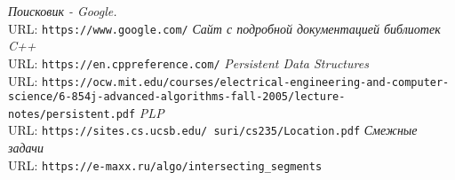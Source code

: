\begin{thebibliography}{99}
{\itshape Поисковик - Google.} \\URL: \texttt{https://www.google.com/}
{\itshape Сайт с подробной документацией библиотек C++} \\URL: \texttt{https://en.cppreference.com/}
{\itshape Persistent Data Structures} \\URL: \texttt{https://ocw.mit.edu/courses/electrical-engineering-and-computer-science/6-854j-advanced-algorithms-fall-2005/lecture-notes/persistent.pdf}
{\itshape PLP} \\URL: \texttt{https://sites.cs.ucsb.edu/~suri/cs235/Location.pdf}
{\itshape Смежные задачи} \\URL: \texttt{https://e-maxx.ru/algo/intersecting\_segments}
\end{thebibliography}
\pagebreak

